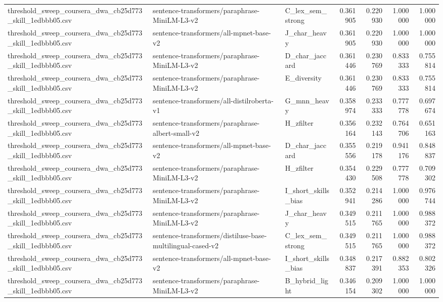 \begin{table}[!ht]
\begin{tabular}{lllrrrr}
threshold\_sweep\_coursera\_dwa\_cb25d773\_skill\_1edbbb05.csv & sentence-transformers/paraphrase-MiniLM-L3-v2 & C\_lex\_sem\_strong & 0.361905 & 0.220930 & 1.000000 & 1.000000 \\
threshold\_sweep\_coursera\_dwa\_cb25d773\_skill\_1edbbb05.csv & sentence-transformers/all-mpnet-base-v2 & J\_char\_heavy & 0.361905 & 0.220930 & 1.000000 & 1.000000 \\
threshold\_sweep\_coursera\_dwa\_cb25d773\_skill\_1edbbb05.csv & sentence-transformers/paraphrase-MiniLM-L3-v2 & D\_char\_jaccard & 0.361446 & 0.230769 & 0.833333 & 0.755814 \\
threshold\_sweep\_coursera\_dwa\_cb25d773\_skill\_1edbbb05.csv & sentence-transformers/paraphrase-MiniLM-L3-v2 & E\_diversity & 0.361446 & 0.230769 & 0.833333 & 0.755814 \\
threshold\_sweep\_coursera\_dwa\_cb25d773\_skill\_1edbbb05.csv & sentence-transformers/all-distilroberta-v1 & G\_mnn\_heavy & 0.358974 & 0.233333 & 0.777778 & 0.697674 \\
threshold\_sweep\_coursera\_dwa\_cb25d773\_skill\_1edbbb05.csv & sentence-transformers/paraphrase-albert-small-v2 & H\_zfilter & 0.356164 & 0.232143 & 0.764706 & 0.651163 \\
threshold\_sweep\_coursera\_dwa\_cb25d773\_skill\_1edbbb05.csv & sentence-transformers/all-mpnet-base-v2 & D\_char\_jaccard & 0.355556 & 0.219178 & 0.941176 & 0.848837 \\
threshold\_sweep\_coursera\_dwa\_cb25d773\_skill\_1edbbb05.csv & sentence-transformers/paraphrase-MiniLM-L3-v2 & H\_zfilter & 0.354430 & 0.229508 & 0.777778 & 0.709302 \\
threshold\_sweep\_coursera\_dwa\_cb25d773\_skill\_1edbbb05.csv & sentence-transformers/paraphrase-MiniLM-L3-v2 & I\_short\_skills\_bias & 0.352941 & 0.214286 & 1.000000 & 0.976744 \\
threshold\_sweep\_coursera\_dwa\_cb25d773\_skill\_1edbbb05.csv & sentence-transformers/paraphrase-MiniLM-L3-v2 & J\_char\_heavy & 0.349515 & 0.211765 & 1.000000 & 0.988372 \\
threshold\_sweep\_coursera\_dwa\_cb25d773\_skill\_1edbbb05.csv & sentence-transformers/distiluse-base-multilingual-cased-v2 & C\_lex\_sem\_strong & 0.349515 & 0.211765 & 1.000000 & 0.988372 \\
threshold\_sweep\_coursera\_dwa\_cb25d773\_skill\_1edbbb05.csv & sentence-transformers/all-mpnet-base-v2 & I\_short\_skills\_bias & 0.348837 & 0.217391 & 0.882353 & 0.802326 \\
threshold\_sweep\_coursera\_dwa\_cb25d773\_skill\_1edbbb05.csv & sentence-transformers/paraphrase-MiniLM-L3-v2 & B\_hybrid\_light & 0.346154 & 0.209302 & 1.000000 & 1.000000 \\

\end{tabular}
\end{table}

